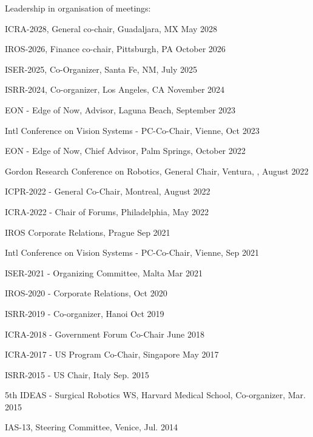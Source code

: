 \documentclass{article}
\begin{document}
\begin{cv}
	\begin{cvlist}{Leadership in organisation of meetings:}
		\item ICRA-2028, General co-chair, Guadaljara, MX \cftdotfill{\cftdotsep} May 2028
		\item IROS-2026, Finance co-chair, Pittsburgh, PA \cftdotfill{\cftdotsep} October 2026
		\item ISER-2025, Co-Organizer, Santa Fe, NM, \cftdotfill{\cftdotsep} July 2025
		\item ISRR-2024, Co-organizer, Los Angeles, CA \cftdotfill{\cftdotsep}  November 2024
		\item EON - Edge of Now, Advisor, Laguna Beach, \cftdotfill{\cftdotsep} September 2023
		\item Intl Conference on Vision Systems - PC-Co-Chair, Vienne,
		\cftdotfill{\cftdotsep} Oct 2023
		\item EON - Edge of Now, Chief Advisor, Palm Springs, \cftdotfill{\cftdotsep}
		October 2022
		\item Gordon Research Conference on Robotics, General Chair, Ventura,
		\cftdotfill{\cftdotsep}, August 2022
		\item ICPR-2022 - General Co-Chair, Montreal, \cftdotfill{\cftdotsep} August
		2022
		\item ICRA-2022 - Chair of Forums, Philadelphia, \cftdotfill{\cftdotsep} May
		2022
		\item IROS Corporate Relations, Prague \cftdotfill{\cftdotsep} Sep 2021
		\item Intl Conference on Vision Systems - PC-Co-Chair, Vienne,
		\cftdotfill{\cftdotsep} Sep 2021
		\item ISER-2021 - Organizing Committee, Malta \cftdotfill{\cftdotsep} Mar 2021
		\item IROS-2020 - Corporate Relations, \cftdotfill{\cftdotsep} Oct 2020
		\item ISRR-2019 - Co-organizer, Hanoi \cftdotfill{\cftdotsep} Oct 2019
		\item ICRA-2018 - Government Forum Co-Chair \cftdotfill{\cftdotsep} June 2018
		\item ICRA-2017 - US Program Co-Chair, Singapore \cftdotfill{\cftdotsep} May
		2017
		\item ISRR-2015 - US Chair, Italy \cftdotfill{\cftdotsep} Sep. 2015
		\item 5th IDEAS - Surgical Robotics WS, Harvard Medical School, Co-organizer,
		\cftdotfill{\cftdotsep} Mar. 2015
		\item IAS-13, Steering Committee, Venice, \cftdotfill{\cftdotsep} Jul. 2014

\end{cvlist}
\end{cv}
\end{document}
